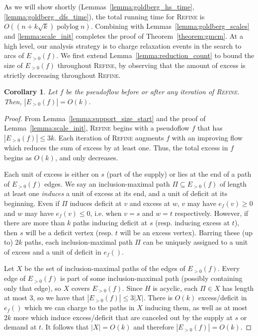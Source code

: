 \documentclass[11pt]{article}
\def\polylog{\mathop{\mathrm{polylog}}}
\theoremstyle{plain}
\newtheorem{corollary}[lemma]{Corollary}
\numberwithin{figure}{section}
\begin{document}
As we will show shortly (Lemmas~\ref{lemma:goldberg_hs_time},
\ref{lemma:goldberg_dfs_time}), the total running time for \textsc{Refine} is
$O((n + k\sqrt{k})\polylog n)$.
Combining with Lemmas~\ref{lemma:goldberg_scales} and \ref{lemma:scale_init}
completes the proof of Theorem~\ref{theorem:gmcm}.
At a high level, our analysis strategy is to charge relaxation events in
the search to arcs of $E_{>0}(f)$.
We first extend Lemma~\ref{lemma:reduction_count} to bound the size of
$E_{>0}(f)$ throughout \textsc{Refine}, by observing that the amount of excess
is strictly decreasing throughout \textsc{Refine}.

\begin{corollary}
\label{corollary:support_size_during}
Let $f$ be the pseudoflow before or after any iteration of \textsc{Refine}.
Then, $|E_{>0}(f)| = O(k)$.
\end{corollary}

\begin{proof}
From Lemma~\ref{lemma:support_size_start} and the proof of
Lemma~\ref{lemma:scale_init}, \textsc{Refine} begins with a pseudoflow $f$ that
has $|E_{>0}(f)| \leq 3k$.
Each iteration of \textsc{Refine} augments $f$ with an improving flow which
reduces the sum of excess by at least one.
Thus, the total excess in $f$ begins as $O(k)$, and only decreases.

Each unit of excess is either on $s$ (part of the supply) or lies at the end of
a path of $E_{>0}(f)$ edges.
We say an inclusion-maximal path $\Pi \subseteq E_{>0}(f)$ of length at least
one \emph{induces} a unit of excess at its end, and a unit of deficit at its
beginning.
Even if $\Pi$ induces deficit at $v$ and excess at $w$, $v$ may have
$e_f(v) \geq 0$ and $w$ may have $e_f(v) \leq 0$, i.e. when $v = s$ and $w = t$
respectively.
However, if there are more than $k$ paths inducing deficit at $s$ (resp.
inducing excess at $t$), then $s$ will be a deficit vertex (resp. $t$ will be
an excess vertex).
Barring these (up to) $2k$ paths, each inclusion-maximal path $\Pi$ can be
uniquely assigned to a unit of excess and a unit of deficit in $e_f()$.

Let $X$ be the set of inclusion-maximal paths of the edges of $E_{>0}(f)$.
Every edge of $E_{>0}(f)$ is part of some inclusion-maximal path
(possibly containing only that edge), so $X$ covers $E_{>0}(f)$.
Since $H$ is acyclic, each $\Pi \in X$ has length at most 3, so we have that
$|E_{>0}(f)| \leq 3|X|$.
There is $O(k)$ excess/deficit in $e_f()$ which we can charge to the paths in
$X$ inducing them, as well as at most $2k$ more which induce excess/deficit
that are canceled out by the supply at $s$ or demand at $t$.
It follows that $|X| = O(k)$ and therefore $|E_{>0}(f)| = O(k)$.
\end{proof}
\end{document}
